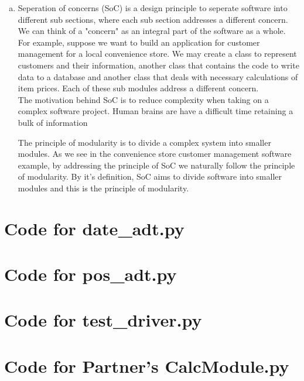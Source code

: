 \documentclass[12pt]{article}
\begin{document}
\begin{enumerate}[(a)]
\item Seperation of concerns (SoC) is a design principle to seperate software into different sub sections, where each sub section addresses a different concern. We can think of a "concern" as an integral part of the software as a whole. For example, suppose we want to build an application for customer management for a local convenience store. We may create a class to represent customers and their information, another class that contains the code to write data to a database and another class that deals with necessary calculations of item prices. Each of these sub modules address a different concern.\\

The motivation behind SoC is to reduce complexity when taking on a complex software project. Human brains are have a difficult time retaining a bulk of information

The principle of modularity is to divide a complex system into smaller modules. As we see in the convenience store customer management software example, by addressing the principle of SoC we naturally follow the principle of modularity. By it's definition, SoC aims to divide software into smaller modules and this is the principle of modularity.\\

\end{enumerate}

\newpage

\lstset{language=Python, basicstyle=\tiny, breaklines=true, showspaces=false,
  showstringspaces=false, breakatwhitespace=true}

\def\thesection{\Alph{section}}

\section{Code for date\_adt.py}

\noindent 

\newpage

\section{Code for pos\_adt.py}

\noindent 

\newpage

\section{Code for test\_driver.py}

\noindent 

\newpage

\section{Code for Partner's CalcModule.py}

\noindent 
\end{document}
